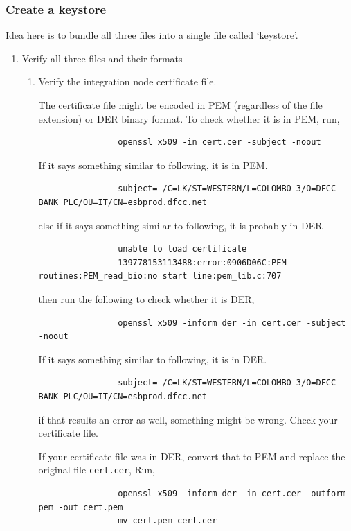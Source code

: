 \documentclass{article}
\begin{document}
    \subsubsection{Create a keystore}
    Idea here is to bundle all three files into a single file called `keystore'.

    \begin{enumerate}[itemsep=4ex]
        \item Verify all three files and their formats
        \begin{enumerate}[itemsep=3ex]
            \item Verify the integration node certificate file.


            The certificate file might be encoded in PEM (regardless of the file extension) or DER binary format. To check whether it is in PEM, run,
            \begin{lstlisting}
                openssl x509 -in cert.cer -subject -noout
            \end{lstlisting}
            If it says something similar to following, it is in PEM.
            \begin{lstlisting}
                subject= /C=LK/ST=WESTERN/L=COLOMBO 3/O=DFCC BANK PLC/OU=IT/CN=esbprod.dfcc.net
            \end{lstlisting}
            else if it says something similar to following, it is probably in DER
            \begin{lstlisting}
                unable to load certificate
                139778153113488:error:0906D06C:PEM routines:PEM_read_bio:no start line:pem_lib.c:707
            \end{lstlisting}
            then run the following to check whether it is DER,
            \begin{lstlisting}
                openssl x509 -inform der -in cert.cer -subject -noout
            \end{lstlisting}
            If it says something similar to following, it is in DER.
            \begin{lstlisting}
                subject= /C=LK/ST=WESTERN/L=COLOMBO 3/O=DFCC BANK PLC/OU=IT/CN=esbprod.dfcc.net
            \end{lstlisting}
            if that results an error as well, something might be wrong. Check your certificate file.

            
            If your certificate file was in DER, convert that to PEM and replace the original file \texttt{cert.cer}, Run,
            \begin{lstlisting}
                openssl x509 -inform der -in cert.cer -outform pem -out cert.pem
                mv cert.pem cert.cer
            \end{lstlisting}


\end{enumerate}
\end{enumerate}
\end{document}
